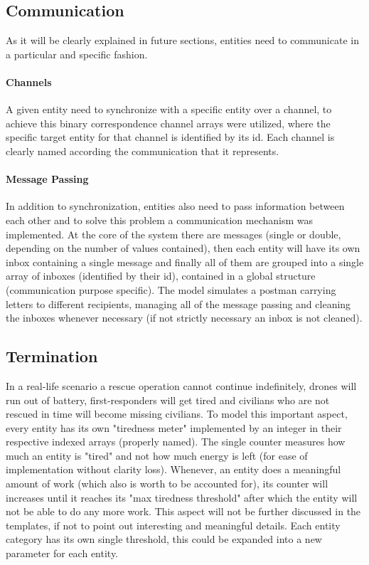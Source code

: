 \subsection{Communication}
As it will be clearly explained in future sections, entities need to communicate in a particular and specific fashion.
\paragraph{Channels}
A given entity need to synchronize with a specific entity over a channel, to achieve this binary correspondence channel arrays were utilized, where the specific target entity for that channel is identified by its id. Each channel is clearly named according the communication that it represents.
\paragraph{Message Passing}
In addition to synchronization, entities also need to pass information between each other and to solve this problem a communication mechanism was implemented. At the core of the system there are messages (single or double, depending on the number of values contained), then each entity will have its own inbox containing a single message and finally all of them are grouped into a single array of inboxes (identified by their id), contained in a global structure (communication purpose specific). The model simulates a postman carrying letters to different recipients, managing all of the message passing and cleaning the inboxes whenever necessary (if not strictly necessary an inbox is not cleaned).


\subsection{Termination}
In a real-life scenario a rescue operation cannot continue indefinitely, drones will run out of battery, first-responders will get tired and civilians who are not rescued in time will become missing civilians. To model this important aspect, every entity has its own "tiredness meter" implemented by an integer in their respective indexed arrays (properly named). The single counter measures how much an entity is "tired" and not how much energy is left (for ease of implementation without clarity loss). Whenever, an entity does a meaningful amount of work (which also is worth to be accounted for), its counter will increases until it reaches its "max tiredness threshold" after which the entity will not be able to do any more work. This aspect will not be further discussed in the templates, if not to point out interesting and meaningful details. Each entity category has its own single threshold, this could be expanded into a new parameter for each entity.



